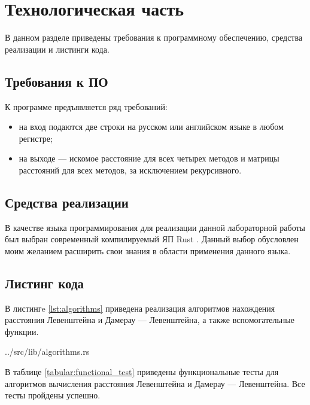 \chapter{Технологическая часть}

В данном разделе приведены требования к программному обеспечению, средства реализации и листинги кода.

\section{Требования к ПО}

К программе предъявляется ряд требований:
\begin{itemize}
	\item на вход подаются две строки на русском или английском языке в любом регистре;
	\item на выходе — искомое расстояние для всех четырех методов и матрицы расстояний для всех методов, за исключением рекурсивного.
\end{itemize}

\section{Средства реализации}

В качестве языка программирования для реализации данной лабораторной работы был выбран современный компилируемый ЯП Rust \cite{rustlang}. Данный выбор обусловлен моим желанием расширить свои знания в области применения данного языка.

\section{Листинг кода}

В листингe \ref{lst:algorithms} приведена реализация алгоритмов нахождения расстояния Левенштейна и Дамерау — Левенштейна, а также вспомогательные функции.

\begin{lstinputlisting}[
	caption={Листинг с алгоритмами},
	label={lst:algorithms},
    style={rust}
]{../src/lib/algorithms.rs}
\end{lstinputlisting}
\clearpage

В таблице \ref{tabular:functional_test} приведены функциональные тесты для алгоритмов вычисления расстояния Левенштейна и Дамерау — Левенштейна. Все тесты пройдены успешно.


